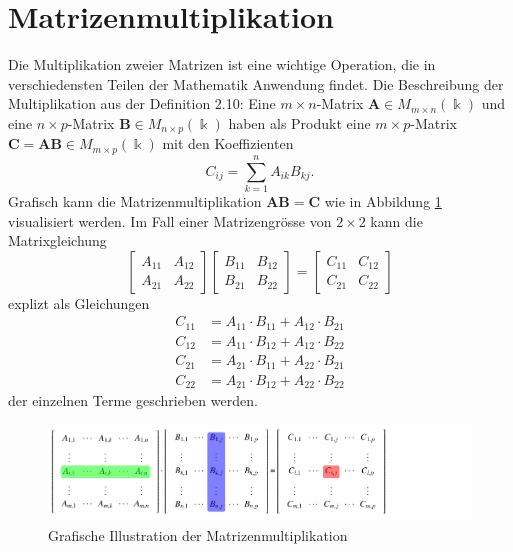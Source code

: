 %
%
%
\section{Matrizenmultiplikation \label{multiplikation:section:einleitung}}

Die Multiplikation zweier Matrizen ist eine wichtige Operation, die in verschiedensten Teilen der Mathematik Anwendung findet.
Die Beschreibung der Multiplikation aus der Definition 2.10:
Eine $m\times n$-Matrix $\mathbf{A}\in M_{m\times n}(\Bbbk)$ und eine
$n\times p$-Matrix $\mathbf{B}\in M_{n\times p}(\Bbbk)$ haben als Produkt
eine $m\times p$-Matrix $\mathbf{C}=\mathbf{AB}\in M_{m\times p}(\Bbbk)$ mit den
Koeffizienten
\begin{equation}
C_{ij} = \sum_{k=1}^n A_{ik} B_{kj}.
\label{multiplikation:eq:MM}
\end{equation}
Grafisch kann die Matrizenmultiplikation $\mathbf{AB}=\mathbf{C}$ wie in Abbildung \ref{multiplikation:fig:mm_viz} visualisiert werden.
%
%
Im Fall einer Matrizengr\"osse von $2\times 2$ kann die Matrixgleichung
\begin{equation}
  \begin{bmatrix}
A_{11} & A_{12}\\
A_{21} & A_{22}
\end{bmatrix}
\begin{bmatrix}
B_{11} & B_{12}\\
B_{21} & B_{22}
\end{bmatrix}
=
\begin{bmatrix}
C_{11} & C_{12}\\
C_{21} & C_{22}
\end{bmatrix}
\end{equation}
explizt als Gleichungen
\begin{equation} \label{multiplikation:eq:MM_exp}
\begin{split}
C_{11} &= A_{11} \cdot B_{11} + A_{12} \cdot B_{21}\\
C_{12} &= A_{11} \cdot B_{12} + A_{12} \cdot B_{22}\\
C_{21} &= A_{21} \cdot B_{11} + A_{22} \cdot B_{21}\\
C_{22} &= A_{21} \cdot B_{12} + A_{22} \cdot B_{22}
\end{split}
\end{equation}
der einzelnen Terme geschrieben werden.
\begin{figure}
	\center
	\includegraphics[]{papers/multiplikation/images/mm_visualisation}
	\caption{Grafische Illustration der Matrizenmultiplikation}
	\label{multiplikation:fig:mm_viz}
\end{figure}

